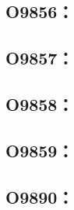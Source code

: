 \clearpage
\subsection{O9856：}



\clearpage
\subsection{O9857：}



\clearpage
\subsection{O9858：}



\clearpage
\subsection{O9859：}



\clearpage
\subsection{O9890：}



